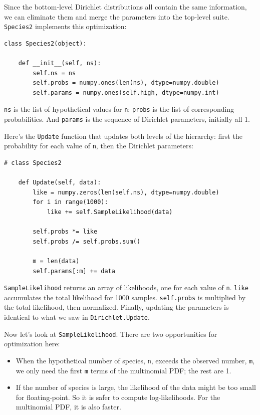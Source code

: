 \documentclass[12pt]{book}
\begin{document}
Since the bottom-level Dirichlet distributions all contain the same
information, we can eliminate them and merge the parameters into
the top-level suite.  {\tt Species2} implements this optimization:

\begin{verbatim}
class Species2(object):
    
    def __init__(self, ns):
        self.ns = ns
        self.probs = numpy.ones(len(ns), dtype=numpy.double)
        self.params = numpy.ones(self.high, dtype=numpy.int)
\end{verbatim}

{\tt ns} is the list of hypothetical values for {\tt n};
{\tt probs} is the list of corresponding probabilities.  And
{\tt params} is the sequence of Dirichlet parameters, initially
all 1.

Here's the {\tt Update} function that updates both levels of
the hierarchy: first the probability for each value of {\tt n},
then the Dirichlet parameters:

\begin{verbatim}
# class Species2

    def Update(self, data):
        like = numpy.zeros(len(self.ns), dtype=numpy.double)
        for i in range(1000):
            like += self.SampleLikelihood(data)

        self.probs *= like
        self.probs /= self.probs.sum()

        m = len(data)
        self.params[:m] += data
\end{verbatim}

{\tt SampleLikelihood} returns an array of likelihoods, one for each
value of {\tt n}.  {\tt like} accumulates the total likelihood for
1000 samples.  {\tt self.probs} is multiplied by the total likelihood,
then normalized.  Finally, updating the parameters is identical to
what we saw in {\tt Dirichlet.Update}.

Now let's look at {\tt SampleLikelihood}.  There are two
opportunities for optimization here:

\begin{itemize}

\item When the hypothetical number of species, {\tt n},
exceeds the observed number, {\tt m}, we only need the first {\tt m}
terms of the multinomial PDF; the rest are 1.

\item If the number of species is large, the likelihood of the data
might be too small for floating-point.  So it is safer to compute
log-likelihoods.  For the multinomial PDF, it is also faster.

\end{itemize}
\end{document}
